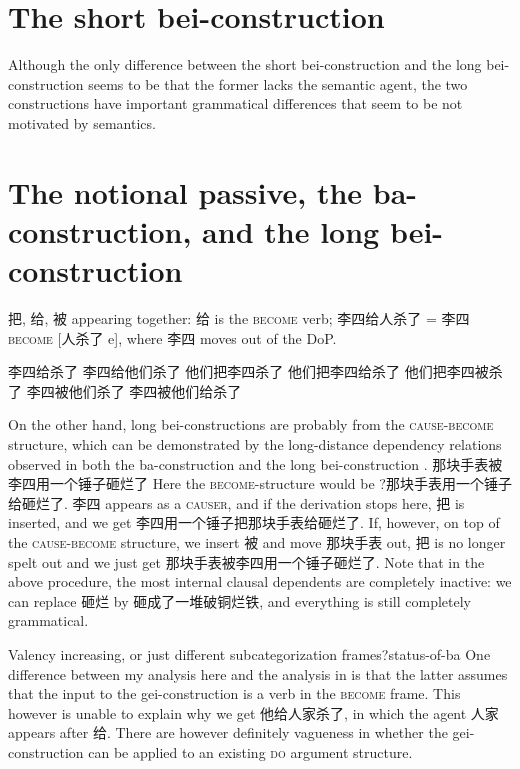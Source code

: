 \documentclass[UTF8, a4paper, oneside, scheme=plain]{ctexrep}
\newcommand*{\citesec}[1]{\S~{#1}}
\newcommand*{\citepage}[1]{p.~{#1}}
\newcommand*{\category}[1]{\textsc{#1}}
\begin{document}
\section{The short bei-construction}

Although the only difference between the short bei-construction 
and the long bei-construction 
seems to be that the former lacks the semantic agent, 
the two constructions have important grammatical differences 
that seem to be not motivated by semantics. 

\section{The notional passive, the ba-construction, and the long bei-construction}

把, 给, 被 appearing together: 给 is the \category{become} verb; 
李四给人杀了 = 李四 \category{become} [人杀了 e], 
where 李四 moves out of the DoP.

\begin{exe}
    \ex 李四给杀了
    \ex 李四给他们杀了
    \ex 他们把李四杀了
    \ex 他们把李四给杀了
    \ex *他们把李四被杀了
    \ex 李四被他们杀了
    \ex 李四被他们给杀了
\end{exe}

On the other hand, long bei-constructions are probably 
from the \category{cause}-\category{become} structure,
which can be demonstrated by the long-distance dependency relations 
observed in both the ba-construction  
and the long bei-construction
\citep[\citesec{4.2.1.5}]{huang2013}.
那块手表被李四用一个锤子砸烂了 
Here the \category{become}-structure would be 
?那块手表用一个锤子给砸烂了. 
李四 appears as a \category{causer},
and if the derivation stops here, 
把 is inserted, and we get 李四用一个锤子把那块手表给砸烂了.
If, however, on top of the \category{cause}-\category{become} structure, 
we insert 被 and move 那块手表 out, 
把 is no longer spelt out 
and we just get 那块手表被李四用一个锤子砸烂了.
Note that in the above procedure, 
the most internal clausal dependents are completely inactive: 
we can replace 砸烂 by 砸成了一堆破铜烂铁, 
and everything is still completely grammatical.

\begin{infobox}{Valency increasing, or just different subcategorization frames?}{status-of-ba}
    One difference between my analysis here and the analysis in \citet[\citepage{202}]{deng2010formal}
    is that the latter assumes that the input to the gei-construction 
    is a verb in the \category{become} frame.
    This however is unable to explain why we get 他给人家杀了,
    in which the agent 人家 appears after 给.
    There are however definitely vagueness in whether 
    the gei-construction can be applied to an existing \category{do} argument structure.
\end{infobox}
\end{document}
